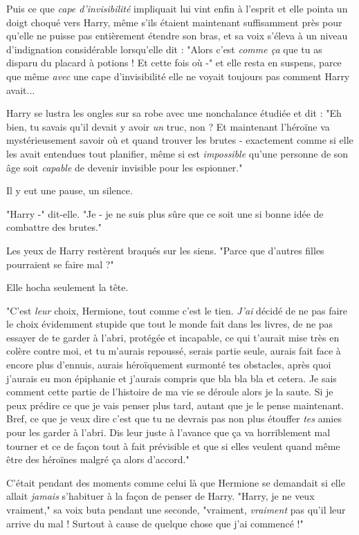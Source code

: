 Puis ce que \emph{cape d'invisibilité}  impliquait lui vint enfin à l'esprit et elle pointa un doigt choqué vers Harry, même s'ils étaient maintenant suffisamment près pour qu'elle ne puisse pas entièrement étendre son bras, et sa voix s'éleva à un niveau d'indignation considérable lorsqu'elle dit : "Alors c'est \emph{comme ça}  que tu as disparu du placard à potions ! Et cette fois où -" et elle resta en suspens, parce que même \emph{avec}  une cape d'invisibilité elle ne voyait toujours pas comment Harry avait...

Harry se lustra les ongles sur sa robe avec une nonchalance étudiée et dit : "Eh bien, tu savais qu'il devait y avoir \emph{un}  truc, non ? Et maintenant l'héroïne va mystérieusement savoir où et quand trouver les brutes - exactement comme si elle les avait entendues tout planifier, même si est \emph{impossible}  qu'une personne de son âge soit \emph{capable } de devenir invisible pour les espionner."

Il y eut une pause, un silence.

"Harry -" dit-elle. "Je - je ne suis plus sûre que ce soit une si bonne idée de combattre des brutes."

Les yeux de Harry restèrent braqués sur les siens. "Parce que d'autres filles pourraient se faire mal ?"

Elle hocha seulement la tête.

"C'est \emph{leur}  choix, Hermione, tout comme c'est le tien. \emph{J'ai}  décidé de ne pas faire le choix évidemment stupide que tout le monde fait dans les livres, de ne pas essayer de te garder à l'abri, protégée et incapable, ce qui t'aurait mise très en colère contre moi, et tu m'aurais repoussé, serais partie seule, aurais fait face à encore plus d'ennuis, aurais héroïquement surmonté tes obstacles, après quoi j'aurais eu mon épiphanie et j'aurais compris que bla bla bla et cetera. Je sais comment cette partie de l'histoire de ma vie se déroule alors je la saute. Si je peux prédire ce que je vais penser plus tard, autant que je le pense maintenant. Bref, ce que je veux dire c'est que tu ne devrais pas non plus étouffer \emph{tes}  amies pour les garder à l'abri. Dis leur juste à l'avance que ça va horriblement mal tourner et ce de façon tout à fait prévisible et que si elles veulent quand même être des héroïnes malgré ça alors d'accord."

C'était pendant des moments comme celui là que Hermione se demandait si elle allait \emph{jamais}  s'habituer à la façon de penser de Harry. "Harry, je ne veux vraiment," sa voix buta pendant une seconde, "vraiment, \emph{vraiment}  pas qu'il leur arrive du mal ! Surtout à cause de quelque chose que j'ai commencé !"

